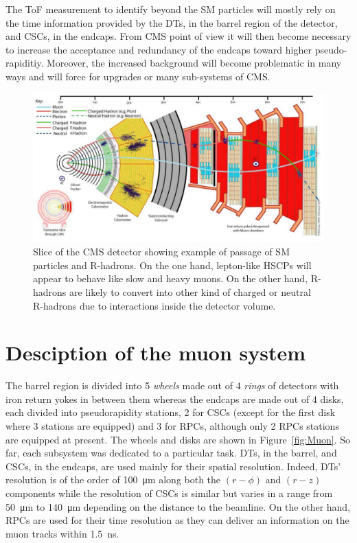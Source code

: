 	The ToF measurement to identify beyond the \acl{SM} particles will mostly rely on the time information provided by the \acl{DT}s, in the barrel region of the detector, and \acl{CSC}s, in the endcaps. From CMS point of view it will then become necessary to increase the acceptance and redundancy of the endcaps toward higher pseudo-rapiditiy. Moreover, the increased background will become problematic in many ways and will force for upgrades or many sub-systems of CMS.

	\begin{figure}[H]
		\centering
		\includegraphics[width=\plotwidth]{fig/chapt3/CMS-slice-HSCPs.png}
		\caption{\label{fig:HSCPs} Slice of the CMS detector showing example of passage of SM particles and R-hadrons. On the one hand, lepton-like HSCPs will appear to behave like slow and heavy muons. On the other hand, R-hadrons are likely to convert into other kind of charged or neutral R-hadrons due to interactions inside the detector volume.}
	\end{figure}
	
\section{Desciption of the muon system}
\label{chapt3:sec:muonsystem}
	
	The barrel region is divided into 5 \textit{wheels} made out of 4 \textit{rings} of detectors with iron return yokes in between them whereas the endcaps are made out of 4 disks, each divided into pseudorapidity stations, 2 for CSCs (except for the first disk where 3 stations are equipped) and 3 for RPCs, although only 2 RPCs stations are equipped at present. The wheels and disks are shown in Figure~\ref{fig:Muon}. So far, each subsystem was dedicated to a particular task. DTs, in the barrel, and CSCs, in the endcaps, are used mainly for their spatial resolution. Indeed, DTs' resolution is of the order of \SI{100}{\micro m} along both the $(r-\phi)$ and $(r-z)$ components while the resolution of CSCs is similar but varies in a range from \SI{50}{\micro m} to \SI{140}{\micro m} depending on the distance to the beamline. On the other hand, RPCs are used for their time resolution as they can deliver an information on the muon tracks within \SI{1.5}{ns}.
	
